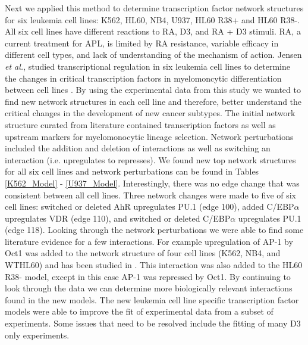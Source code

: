 \documentclass[12pt]{article}
\begin{document}
Next we applied this method to determine transcription factor network structures for six leukemia cell lines: K562, HL60, NB4, U937, HL60 R38+ and HL60 R38-.  
All six cell lines have different reactions to RA, D3, and RA + D3 stimuli. 
RA, a current treatment for APL, is limited by RA resistance, variable efficacy in different cell types, and lack of understanding of the mechanism of action. 
Jensen \textit{et al.}, studied transcriptional regulation in six leukemia cell lines to determine the changes in critical transcription factors in myelomoncytic differentiation between cell lines \cite{Jensen2015}. 
By using the experimental data from this study we wanted to find new network structures in each cell line and therefore, better understand the critical changes in the development of new cancer subtypes.  
The initial network structure curated from literature contained transcription factors as well as upstream markers for myelomonocytic lineage selection.
Network perturbations included the addition and deletion of interactions as well as switching an interaction (i.e. upregulates to represses). 
We found new top network structures for all six cell lines and network perturbations can be found in Tables \ref{K562_Model} - \ref{U937_Model}.
Interestingly, there was no edge change that was consistent between all cell lines.
Three network changes were made to five of six cell lines: switched or deleted AhR upregulates PU.1 (edge 100), added C/EBP$\alpha$ upregulates VDR (edge 110), and switched or deleted C/EBP$\alpha$ upregulates PU.1 (edge 118). 
Looking through the network perturbations we were able to find some literature evidence for a few interactions.
For example upregulation of AP-1 by Oct1 was added to the network structure of four cell lines (K562, NB4, and WTHL60) and has been studied in \cite{Ullman1993}. 
This interaction was also added to the HL60 R38- model, except in this case AP-1 was repressed by Oct1. 
By continuing to look through the data we can determine more biologically relevant interactions found in the new models. 
The new leukemia cell line specific transcription factor models were able to improve the fit of experimental data from a subset of experiments. 
Some issues that need to be resolved include the fitting of many D3 only experiments. 
\end{document}

